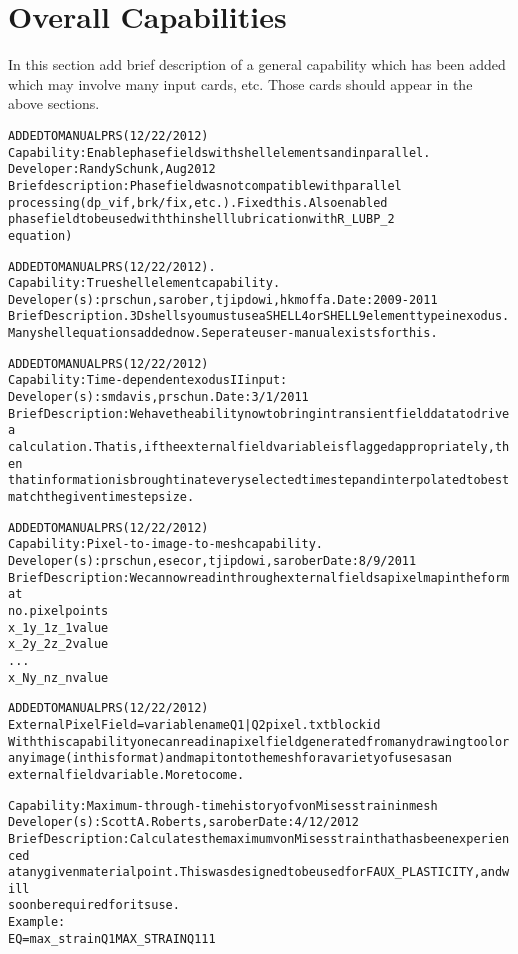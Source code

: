 \documentclass{article}
\begin{document}
\section{Overall Capabilities}
In this section add brief description of a general capability which has been added which may involve many input cards, etc. Those cards should appear in the above sections.  
\begin{alltt}

ADDED TO MANUAL PRS (12/22/2012)
Capability:  Enable phase fields with shell elements and in parallel.
Developer: Randy Schunk, Aug 2012
Brief description: Phase field was not compatible with parallel
processing (dp_vif, brk/fix, etc.).    Fixed this.   Also enabled
phase field to be used with thin shell lubrication with R_LUBP_2
equation)

ADDED TO MANUAL PRS (12/22/2012). 
Capability: True shell element capability.   
Developer(s): prschun, sarober, tjipdowi, hkmoffa.  Date: 2009-2011
Brief Description.  3D shells you must use a SHELL4 or SHELL9 element type in exodus.   
  Many shell equations added now. Seperate user-manual exists for this.  

ADDED TO MANUAL PRS (12/22/2012)
Capability: Time-dependent exodus II input:   
Developer(s): smdavis, prschun.  Date: 3/1/2011
Brief Description: We have the ability now to bring in transient field data to drive a 
  calculation.   That is, if the external field variable is flagged appropriately, then 
  that information is brought in at every selected time step and interpolated to best 
  match the given time step size.   

ADDED TO MANUAL PRS (12/22/2012)
Capability: Pixel-to-image-to-mesh capability.
Developer(s): prschun, esecor, tjipdowi, sarober Date:8/9/2011
Brief Description:  We can now read in through external fields a pixel map in the format 
  no. pixel points
  x_1 y_1 z_1 value
  x_2 y_2 z_2 value
  ...
  x_N y_n z_n value

ADDED TO MANUAL PRS (12/22/2012)
External Pixel Field = {variable name} {Q1|Q2} pixel.txt {blockid}
With this capability one can read in a pixel field generated from any drawing tool or 
  any image (in this format) and map it onto the mesh for a variety of uses as an 
  external field variable.  More to come. 

Capability:  Maximum-through-time history of von Mises strain in mesh
Developer(s):  Scott A. Roberts, sarober  Date:  4/12/2012
Brief Description:  Calculates the maximum von Mises strain that has been experienced
at any given material point.  This was designed to be used for FAUX_PLASTICITY, and will
soon be required for its use.
Example:  
EQ = max_strain       Q1 MAX_STRAIN    Q1 1               1


\end{alltt}
\end{document}
